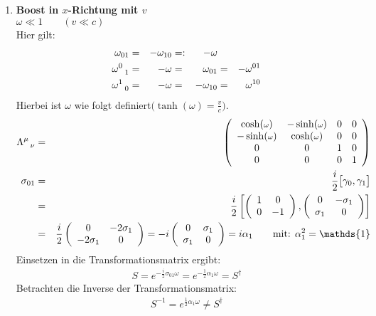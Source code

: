 \begin{enumerate}
\item {\bf Boost in $x$-Richtung mit $v$}\\
$\omega \ll 1 \qquad (v\ll c)$\\
Hier gilt:
\begin{alignat*}{6}
\omega_{01} &=& - \omega_{1 0 } &=:& -\omega &{}&\\
\omega^0 _{\ \ 1} &=& - \omega &=& \omega_{01} &=& - \omega^{01}\\
\omega^1_{\ \ 0} &=& - \omega &=& - \omega_{1 0} &=& \omega^{1 0}
\end{alignat*}
Hierbei ist $\omega$ wie folgt definiert$ \big(\tanh({\scriptstyle \omega})= \frac v c\big)$.
\begin{eqnarray*}\Lambda^{\mu}_{\ \ \nu} \g \left( \begin{array}{cccc}\cosh({\scriptstyle \omega})&-\sinh({\scriptstyle \omega})&0&0\\
-\sinh({\scriptstyle \omega})&\cosh({\scriptstyle \omega})&0&0\\
0&0&1&0\\0&0&0&1\end{array}\ri)\\
\sigma_{01} \g \frac i 2 \big[\gamma_0, \gamma_1 \big]\\
\g \frac i 2 \left[ \left(\begin{array}{cc}1&0\\0&-1\end{array}\ri), \left(\begin{array}{cc}0&-\sigma_1\\ \sigma_1&0\end{array}\ri)\ri ]\\
\g \frac i 2 \left( \begin{array}{c c}0 & -2 \sigma_1\\ - 2 \sigma_1 & 0 \end{array}\ri ) = - i\left( \begin{array}{c c}0 &  \sigma_1\\ \sigma_1 & 0 \end{array}\ri ) = i\alpha_1 \qquad\text{mit: }\alpha_1^2=\mathds{1}
\end{eqnarray*} 
Einsetzen in die Transformationsmatrix ergibt:
\begin{eqnarray*}
S = e^{-\frac i2\sigma_{01}\omega} = e^{-\frac 1 2\alpha_1 \omega} = S^{\dagger}
\end{eqnarray*}
Betrachten die Inverse der Transformationsmatrix:
\begin{eqnarray*}
S^{-1} = e^{\frac 1 2\alpha_1 \omega} \neq S^{\dagger}

\end{eqnarray*}
\end{enumerate}
